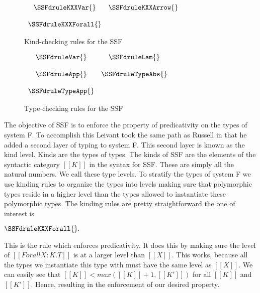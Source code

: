 \begin{figure}
  \begin{center}
    \begin{math}
      \begin{array}{ccc}
        \SSFdruleKXXVar{} & \SSFdruleKXXArrow{}\\
        & \\
        \SSFdruleKXXForall{} 
      \end{array}
    \end{math}
  \end{center}
  \caption{Kind-checking rules for the SSF}
  \label{fig:SSF_kinding}
\end{figure}
\begin{figure}
  \begin{center}
    \begin{math}
      \begin{array}{ccc}
        \SSFdruleVar{} & \SSFdruleLam{}\\
        & \\
        \SSFdruleApp{} & \SSFdruleTypeAbs{}\\
        & \\
        \SSFdruleTypeApp{}
      \end{array}
    \end{math}
  \end{center}
  \caption{Type-checking rules for the SSF}
  \label{fig:SSF_typing}
\end{figure}
The objective of SSF is to enforce the property of predicativity on
the types of system F.  To accomplish this Leivant took the same path
as Russell in that he added a second layer of typing to system F. This
second layer is known as the kind level.  Kinds are the types of
types.  The kinds of SSF are the elements of the syntactic category
$[[K]]$ in the syntax for SSF.  These are simply all the natural
numbers.  We call these type levels.  To stratify the types of system
F we use kinding rules to organize the types into levels making sure
that polymorphic types reside in a higher level than the types allowed
to instantiate these polymorphic types.  The kinding rules are pretty
straightforward the one of interest is
\begin{center}
  \begin{math}
    \SSFdruleKXXForall{}.
  \end{math}
\end{center}
This is the rule which enforces predicativity. It does this by making
sure the level of $[[Forall X:K.T]]$ is at a larger level than
$[[X]]$.  This works, because all the types we instantiate this type
with must have the same level as $[[X]]$. We can easily see that
$[[K]] < max([[K]]+1,[[K']])$ for all $[[K]]$ and $[[K']]$.  Hence,
resulting in the enforcement of our desired property.

